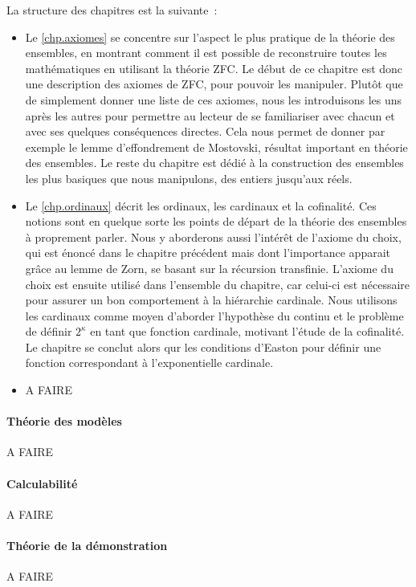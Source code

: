 La structure des chapitres est la suivante~:
\begin{itemize}
\item Le \cref{chp.axiomes} se concentre sur l'aspect le plus pratique de la
  théorie des ensembles, en montrant comment il est possible de reconstruire
  toutes les mathématiques en utilisant la théorie ZFC. Le début de ce chapitre
  est donc une description des axiomes de ZFC, pour pouvoir les manipuler.
  Plutôt que de simplement donner une liste de ces axiomes, nous les
  introduisons les uns après les autres pour permettre au lecteur de se
  familiariser avec chacun et avec ses quelques conséquences directes. Cela nous
  permet de donner par exemple le lemme d'effondrement de Mostovski, résultat
  important en théorie des ensembles. Le reste du chapitre est dédié à la
  construction des ensembles les plus basiques que nous manipulons, des entiers
  jusqu'aux réels.
\item Le \cref{chp.ordinaux} décrit les ordinaux, les cardinaux et la
  cofinalité. Ces notions sont en quelque sorte les points de départ de la
  théorie des ensembles à proprement parler. Nous y aborderons aussi l'intérêt
  de l'axiome du choix, qui est énoncé dans le chapitre précédent mais dont
  l'importance apparait grâce au lemme de Zorn, se basant sur la récursion
  transfinie. L'axiome du choix est ensuite utilisé dans l'ensemble du chapitre,
  car celui-ci est nécessaire pour assurer un bon comportement à la hiérarchie
  cardinale. Nous utilisons les cardinaux comme moyen d'aborder l'hypothèse du
  continu et le problème de définir $2^\kappa$ en tant que fonction cardinale,
  motivant l'étude de la cofinalité. Le chapitre se conclut alors qur les
  conditions d'Easton pour définir une fonction correspondant à l'exponentielle
  cardinale.
\item A FAIRE
\end{itemize}

\paragraph{Théorie des modèles}
A FAIRE

\paragraph{Calculabilité}
A FAIRE

\paragraph{Théorie de la démonstration}
A FAIRE

